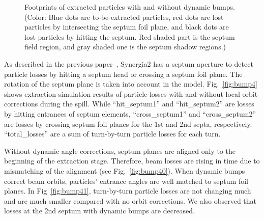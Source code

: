 \documentclass[aps,prstab,onecolumn,preprint,endfloats,11pt]{revtex4-1}
\begin{document}
\begin{figure}[!tbp]
  \caption{\label{fig:bump3}Footprints of extracted particles with and without dynamic bumps. (Color: Blue dots are to-be-extracted particles, red dots are lost particles by intersecting the septum foil plane, and black dots are lost particles by hitting the septum. Red shaded part is the septum field region, and gray shaded one is the septum shadow regions.)}
\end{figure}

As described in the previous paper~\cite{mu2e}, Synergia2 has a septum aperture to detect particle losses by hitting a septum head or crossing a septum foil plane. The rotation of the septum plane is taken into account in the model. Fig.~\ref{fig:bump4} shows extraction simulation results of particle losses with and without local orbit corrections during the spill.
While ``hit\_septum1'' and ``hit\_septum2'' are losses by hitting entrances of septum elements, ``cross\_septum1'' and ``cross\_septum2'' are losses by crossing septum foil planes for the 1st and 2nd septa, respectively. ``total\_losses'' are a sum of turn-by-turn particle losses for each turn.

Without dynamic angle corrections, septum planes are aligned only to the beginning of the extraction stage. Therefore, beam losses are rising in time due to mismatching of the alignment (see Fig.~\ref{fig:bump40}). When dynamic bumps correct beam orbits, particles' entrance angles are well matched to septum foil planes. In Fig~\ref{fig:bump41}, turn-by-turn particle losses are not changing much and are much smaller compared with no orbit corrections. We also observed that losses at the 2nd septum with dynamic bumps are decreased.
\end{document}
